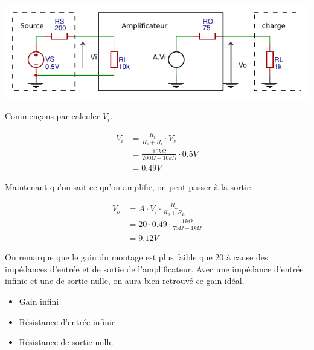 \documentclass{../template/tp}
\begin{document}
%
{
	\begin{center}
		\includegraphics[scale=1.4]{ampli-correction}
	\end{center}

	Commençons par calculer $V_i$.

	\begin{align*}
		V_i & = \frac{R_i}{R_s + R_i} \cdot V_s \\
		& = \frac{10 k\Omega}{200 \Omega + 10 k\Omega} \cdot 0.5 V \\
		& = 0.49 V
	\end{align*}

	Maintenant qu'on sait ce qu'on amplifie, on peut passer à la sortie.

	\begin{align*}
		V_o & = A \cdot V_i \cdot \frac{R_L}{R_o + R_L} \\
		& = 20 \cdot 0.49 \cdot \frac{1 k\Omega}{75 \Omega + 1 k\Omega} \\
		& = 9.12 V
	\end{align*}

	On remarque que le gain du montage est plus faible que 20 à cause des impédances d'entrée et de sortie de l'amplificateur.
	Avec une impédance d'entrée infinie et une de sortie nulle, on aura bien retrouvé ce gain idéal.

}

{
	\begin{itemize}
		\item Gain infini
		\item Résistance d'entrée infinie
		\item Résistance de sortie nulle
	\end{itemize}
}
\end{document}
